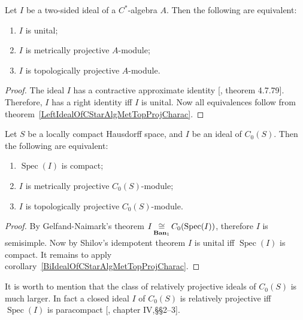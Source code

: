 \begin{corollary}\label{BiIdealOfCStarAlgMetTopProjCharac} Let $I$ be a
two-sided ideal of a $C^*$-algebra $A$. Then the following are equivalent:

\begin{enumerate}[label = (\roman*)]
    \item $I$ is unital;

    \item $I$ is metrically projective $A$-module;

    \item $I$ is topologically projective $A$-module.
\end{enumerate}
\end{corollary}
\begin{proof} The ideal $I$ has a contractive approximate identity
[\cite{HelBanLocConvAlg}, theorem 4.7.79]. Therefore, $I$ has a right identity
iff $I$ is unital. Now all equivalences follow from
theorem~\ref{LeftIdealOfCStarAlgMetTopProjCharac}. 
\end{proof}

\begin{corollary}\label{IdealofCommCStarAlgMetTopProjCharac} Let $S$ be a
locally compact Hausdorff space, and $I$ be an ideal of $C_0(S)$. Then the
following are equivalent:

\begin{enumerate}[label = (\roman*)]
    \item $\operatorname{Spec}(I)$ is compact;

    \item $I$ is metrically projective $C_0(S)$-module;

    \item $I$ is topologically projective $C_0(S)$-module.
\end{enumerate}
\end{corollary}
\begin{proof} By Gelfand-Naimark's theorem
$I\mathop{\mathbin{\cong}}\limits_{\mathbf{Ban}_1}C_0(\operatorname{Spec}(I))$, therefore $I$ is
semisimple. Now by Shilov's idempotent theorem $I$ is unital iff
$\operatorname{Spec}(I)$ is compact. It remains to apply
corollary~\ref{BiIdealOfCStarAlgMetTopProjCharac}. 
\end{proof}

It is worth to mention that the class of relatively projective ideals of
$C_0(S)$ is much larger. In fact a closed ideal $I$ of $C_0(S)$ is relatively
projective iff $\operatorname{Spec}(I)$ is paracompact
[\cite{HelHomolBanTopAlg}, chapter IV,\S\S 2--3].

